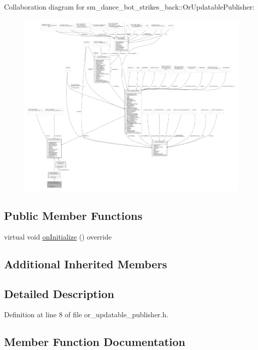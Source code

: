 Collaboration diagram for sm\+\_\+dance\+\_\+bot\+\_\+strikes\+\_\+back\+:\+:Or\+Updatable\+Publisher\+:
\nopagebreak
\begin{figure}[H]
\begin{center}
\leavevmode
\includegraphics[width=350pt]{classsm__dance__bot__strikes__back_1_1OrUpdatablePublisher__coll__graph}
\end{center}
\end{figure}
\subsection*{Public Member Functions}
\begin{DoxyCompactItemize}
\item 
virtual void \hyperlink{classsm__dance__bot__strikes__back_1_1OrUpdatablePublisher_a3ddd0dbf5764d2991c6f0eda3b75bd19}{on\+Initialize} () override
\end{DoxyCompactItemize}
\subsection*{Additional Inherited Members}


\subsection{Detailed Description}


Definition at line 8 of file or\+\_\+updatable\+\_\+publisher.\+h.



\subsection{Member Function Documentation}
\mbox{\label{classsm__dance__bot__strikes__back_1_1OrUpdatablePublisher_a3ddd0dbf5764d2991c6f0eda3b75bd19}} 
